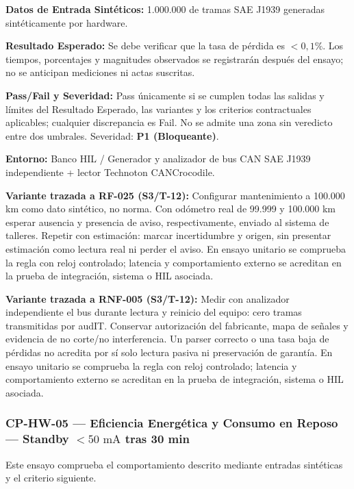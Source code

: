 \par\noindent \textbf{Datos de Entrada Sintéticos:} 1.000.000 de tramas SAE J1939 generadas sintéticamente por hardware.\par
\par\noindent \textbf{Resultado Esperado:} Se debe verificar que la tasa de pérdida es $< 0{,}1\%$. Los tiempos, porcentajes y magnitudes observados se registrarán después del ensayo; no se anticipan mediciones ni actas suscritas.\par
\par\noindent \textbf{Pass/Fail y Severidad:} Pass únicamente si se cumplen todas las salidas y límites del Resultado Esperado, las variantes y los criterios contractuales aplicables; cualquier discrepancia es Fail. No se admite una zona sin veredicto entre dos umbrales. Severidad: \textbf{P1 (Bloqueante)}.\par
\par\noindent \textbf{Entorno:} Banco HIL / Generador y analizador de bus CAN SAE J1939 independiente + lector Technoton CANCrocodile.\par

\par\noindent \textbf{Variante trazada a RF-025 (S3/T-12):} Configurar mantenimiento a 100.000 km como dato sintético, no norma. Con odómetro real de 99.999 y 100.000 km esperar ausencia y presencia de aviso, respectivamente, enviado al sistema de talleres. Repetir con estimación: marcar incertidumbre y origen, sin presentar estimación como lectura real ni perder el aviso. En ensayo unitario se comprueba la regla con reloj controlado; latencia y comportamiento externo se acreditan en la prueba de integración, sistema o HIL asociada.\par

\par\noindent \textbf{Variante trazada a RNF-005 (S3/T-12):} Medir con analizador independiente el bus durante lectura y reinicio del equipo: cero tramas transmitidas por audIT. Conservar autorización del fabricante, mapa de señales y evidencia de no corte/no interferencia. Un parser correcto o una tasa baja de pérdidas no acredita por sí solo lectura pasiva ni preservación de garantía. En ensayo unitario se comprueba la regla con reloj controlado; latencia y comportamiento externo se acreditan en la prueba de integración, sistema o HIL asociada.\par


\subsubsection*{CP-HW-05 — Eficiencia Energética y Consumo en Reposo — Standby $< 50\text{ mA}$ tras 30 min}\label{sec:9-cp-hw-05}
Este ensayo comprueba el comportamiento descrito mediante entradas sintéticas y el criterio siguiente.

